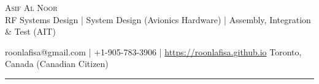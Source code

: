 \documentclass[10pt, Letter]{article}
\newcommand{\metasection}[2]
{
\footnotesize{#2} \hspace*{\fill} \footnotesize{#1}\\[1pt]
}
\begin{document}
\pagestyle{fancy}	








\vspace{-8pt}
\begin{center}
	\huge \textsc{Asif Al Noor} \\[2pt]
	\small RF Systems Design | System Design (Avionics Hardware) | Assembly, Integration \& Test (AIT)
\end{center}



\vspace{6pt}


\vspace{-10pt}
\metasection{Toronto, Canada (Canadian Citizen)}{roonlafisa@gmail.com | +1-905-783-3906 | \href{https://roonlafisa.github.io}{https://roonlafisa.github.io}}
\vspace{-6pt}
\textcolor{softcol}{\hrule}


\normalsize

\end{document}
